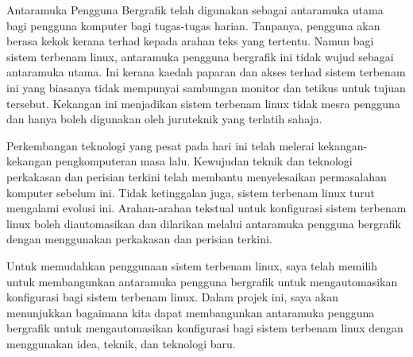 \begin{abstrak}
Antaramuka Pengguna Bergrafik telah digunakan sebagai antaramuka utama bagi pengguna komputer bagi tugas-tugas harian. Tanpanya, pengguna akan berasa kekok kerana terhad kepada arahan teks yang tertentu. Namun bagi sistem terbenam linux, antaramuka pengguna bergrafik ini tidak wujud sebagai antaramuka utama. Ini kerana kaedah paparan dan akses terhad sistem terbenam ini yang biasanya tidak mempunyai sambungan monitor dan tetikus untuk tujuan tersebut. Kekangan ini menjadikan sistem terbenam linux tidak mesra pengguna dan hanya boleh digunakan oleh juruteknik yang terlatih sahaja.

Perkembangan teknologi yang pesat pada hari ini telah melerai kekangan-kekangan pengkomputeran masa lalu. Kewujudan teknik dan teknologi perkakasan dan perisian terkini telah membantu menyelesaikan permasalahan komputer sebelum ini. Tidak ketinggalan juga, sistem terbenam linux turut mengalami evolusi ini. Arahan-arahan tekstual untuk konfigurasi sistem terbenam linux boleh diautomasikan dan dilarikan melalui antaramuka pengguna bergrafik dengan menggunakan perkakasan dan perisian terkini.

Untuk memudahkan penggunaan sistem terbenam linux, saya telah memilih untuk membangunkan antaramuka pengguna bergrafik untuk mengautomasikan konfigurasi bagi sistem terbenam linux. Dalam projek ini, saya akan menunjukkan bagaimana kita dapat membangunkan antaramuka pengguna bergrafik untuk mengautomasikan konfigurasi bagi sistem terbenam linux dengan menggunakan idea, teknik, dan teknologi baru.
\end{abstrak}
